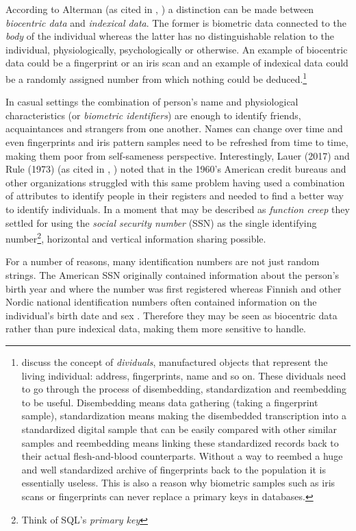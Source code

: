 According to Alterman (as cited in \citeauthor{ajana2013}, \citeyear[8]{ajana2013}) a distinction can be made between \emph{biocentric data} and \emph{indexical data}. The former is biometric data connected to the \emph{body} of the individual whereas the latter has no distinguishable relation to the individual, physiologically, psychologically or otherwise. An example of biocentric data could be a fingerprint or an iris scan and an example of indexical data could be a randomly assigned number from which nothing could be deduced.\footnote{\citet{brensinger2021} discuss the concept of \emph{dividuals}, manufactured objects that represent the living individual: address, fingerprints, name and so on. These dividuals need to go through the process of disembedding, standardization and reembedding to be useful. Disembedding means data gathering (taking a fingerprint sample), standardization means making the disembedded transcription into a standardized digital sample that can be easily compared with other similar samples and reembedding means linking these standardized records back to their actual flesh-and-blood counterparts. Without a way to reembed a huge and well standardized archive of fingerprints back to the population it is essentially useless. This is also a reason why biometric samples such as iris scans or fingerprints can never replace a primary keys in databases.}

In casual settings the combination of person's name and physiological characteristics (or \emph{biometric identifiers}) are enough to identify friends, acquaintances and strangers from one another. Names can change over time and even fingerprints and iris pattern samples need to be refreshed from time to time, making them poor from self-sameness perspective. Interestingly, Lauer (2017) and Rule (1973) (as cited in \citeauthor{brensinger2021}, \citeyear[31--32]{brensinger2021}) noted that in the 1960's American credit bureaus and other organizations struggled with this same problem having used a combination of attributes to identify people in their registers and needed to find a better way to identify individuals. In a moment that may be described as \emph{function creep} they settled for using the \emph{social security number} (SSN) as the single identifying number\footnote{Think of SQL's \emph{primary key}}, horizontal and vertical information sharing possible.

For a number of reasons, many identification numbers are not just random strings. The American SSN originally contained information about the person's birth year and where the number was first registered \citep[32]{brensinger2021} whereas Finnish and other Nordic national identification numbers often contained information on the individual's birth date and sex \citep{watson2010, salste2021}. Therefore they may be seen as biocentric data rather than pure indexical data, making them more sensitive to handle.

